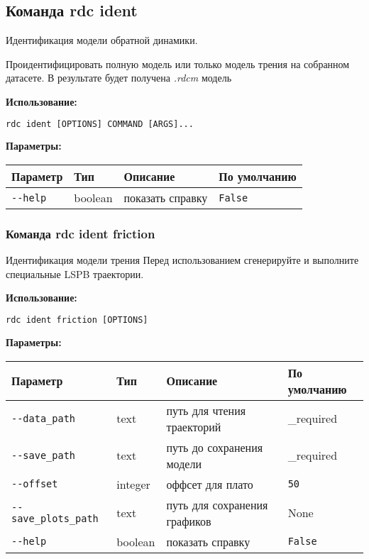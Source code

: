 \hypertarget{rdc-ident}{%
\subsection{Команда rdc ident}\label{rdc-ident}}

Идентификация модели обратной динамики.

Проидентифицировать полную модель или только модель трения на собранном датасете. В результате будет получена \textit{.rdcm} модель

\textbf{Использование:}
\begin{lstlisting}[language=python, numbers=none, frame=single]
rdc ident [OPTIONS] COMMAND [ARGS]...
\end{lstlisting}

\textbf{Параметры:}
\begin{center}
\fontsize{10pt}{10pt}\selectfont
\begin{longtable}[]{p{5cm}|p{2cm}|p{3.5cm}|p{5cm}}
    \hline
\toprule()
Параметр & Тип & Описание & По умолчанию \\
\hline
\midrule()
\endhead
\texttt{-\/-help} & boolean & показать справку &
\texttt{False} \\
\bottomrule()
\hline
\end{longtable}
\end{center}

\hypertarget{rdc-ident-friction}{%
\subsubsection{ Команда rdc ident friction}\label{rdc-ident-friction}}
Идентификация модели трения
Перед использованием сгенерируйте и выполните специальные LSPB траектории.

\textbf{Использование:}
\begin{lstlisting}[language=python, numbers=none, frame=single]
rdc ident friction [OPTIONS]
\end{lstlisting}

\textbf{Параметры:}
\begin{center}
\fontsize{10pt}{10pt}\selectfont
\begin{longtable}[]{p{5cm}|p{2cm}|p{3.5cm}|p{5cm}}
    \hline
\toprule()
Параметр & Тип & Описание & По умолчанию \\
\hline
\midrule()
\endhead
\texttt{-\/-data\_path} & text & путь для чтения траекторий &
\_required \\
\hline
\texttt{-\/-save\_path} & text & путь до сохранения модели & \_required \\
\hline
\texttt{-\/-offset} & integer & оффсет для плато & \texttt{50} \\
\hline
\texttt{-\/-save\_plots\_path} & text & путь для сохранения графиков & None \\
\hline
\texttt{-\/-help} & boolean & показать справку &
\texttt{False} \\
\hline
\bottomrule()
\hline
\end{longtable}
\end{center}

